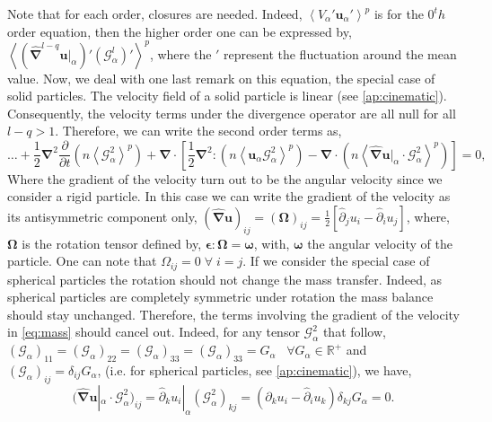 Note that for each order, closures are needed.
Indeed, $\left<V_\alpha'\bm{u}_\alpha'\right>^p$ is for the $0^th$ order equation, then the higher order one can be expressed by, 
$\left<(\hat{\bm{\nabla}}^{l-q} \bm{u}|_\alpha)' (\mathcal{G}_\alpha^l)'\right>^p$, where the $'$ represent the fluctuation around the mean value. 
Now, we deal with one last remark on this equation, the special case of solid particles. 
The velocity field of a solid particle is linear (see \ref{ap:cinematic}). 
Consequently, the velocity terms under the divergence operator are all null for all $l - q > 1$. 
Therefore, we can write the second order terms as, 
\begin{equation}
    \ldots +    
    \frac{1}{2}  \bm{\nabla}^2
    \frac{\partial }{\partial t}\left(
          n \left<\mathcal{G}_\alpha^2\right>^p
    \right) 
    + \bm{\nabla}\cdot\left[
        \frac{1}{2} \bm{\nabla}^{2} : (n \left< \bm{u}_\alpha \mathcal{G}_\alpha^2\right>^p)
        - \bm{\nabla} \cdot \left(  n \left<\hat{\bm{\nabla}} \bm{u}|_\alpha \cdot \mathcal{G}_\alpha^2\right>^p\right)
    \right]
    = 0,
    \label{eq:mass}
\end{equation}
Where the gradient of the velocity turn out to be the angular velocity since we consider a rigid particle.
In this case we can write the gradient of the velocity as its antisymmetric component only, $(\hat{\bm{\nabla}} \bm{u})_{ij} = (\bm{\Omega})_{ij} = \frac{1}{2} \left[\hat{\partial}_j u_i -\hat{\partial}_i u_j \right]$\citep{guazzelli2011},
where, $\bm{\Omega}$ is the rotation tensor defined by, $\bm{\epsilon} : \bm{\Omega} = \bm{\omega}$, with, $\bm{\omega}$ the angular velocity of the particle.
One can note that $\Omega_{ij} = 0 \; \forall \; i = j$.  
If we consider the special case of spherical particles the rotation should not change the mass transfer.
Indeed, as spherical particles are completely symmetric under rotation the mass balance should stay unchanged. 
Therefore, the terms involving the gradient of the velocity in \ref{eq:mass} should cancel out. 
Indeed, for any tensor $\mathcal{G}_\alpha^2$ that follow, $(\mathcal{G}_\alpha)_{11} = (\mathcal{G}_\alpha)_{22} = (\mathcal{G}_\alpha)_{33} =(\mathcal{G}_\alpha)_{33} =G_\alpha \;\;\;\forall G_\alpha \in \mathbb{R}^+$ and $(\mathcal{G}_\alpha)_{ij} = \delta_{ij} G_\alpha$, (i.e. for spherical particles, see \ref{ap:cinematic}),
we have, 
\begin{equation*}
    (\hat{\bm{\nabla}} \bm{u}|_\alpha \cdot \mathcal{G}_\alpha^2)_{ij} 
    = \hat{\partial}_k u_i|_\alpha (\mathcal{G}_\alpha^2)_{kj}
    = (\hat{\partial}_k u_i -\hat{\partial}_i u_k)  \delta_{kj} G_\alpha
    = 0. 
\end{equation*}
